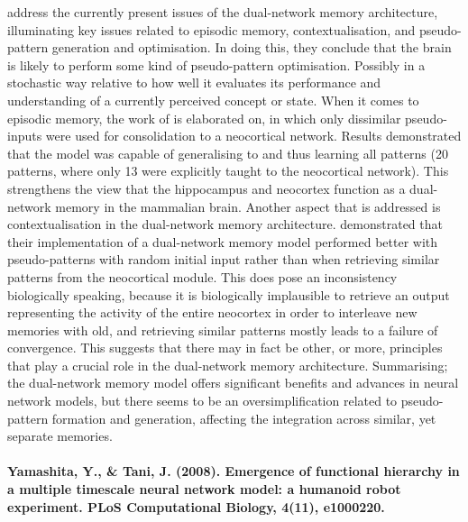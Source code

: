 \cite{French2001} address the currently present issues of the dual-network memory architecture, illuminating key issues related to episodic memory, contextualisation, and pseudo-pattern generation and optimisation. In doing this, they conclude that the brain is likely to perform some kind of pseudo-pattern optimisation. Possibly in a stochastic way relative to how well it evaluates its performance and understanding of a currently perceived concept or state. When it comes to episodic memory, the work of \cite{Ans2000} is elaborated on, in which only dissimilar pseudo-inputs were used for consolidation to a neocortical network. Results demonstrated that the model was capable of generalising to and thus learning all patterns (20 patterns, where only 13 were explicitly taught to the neocortical network). This strengthens the view that the hippocampus and neocortex function as a dual-network memory in the mammalian brain. Another aspect that is addressed is contextualisation in the dual-network memory architecture. \cite{Ans2000} demonstrated that their implementation of a dual-network memory model performed better with pseudo-patterns with random initial input rather than when retrieving similar patterns from the neocortical module. This does pose an inconsistency biologically speaking, because it is biologically implausible to retrieve an output representing the activity of the entire neocortex in order to interleave new memories with old, and retrieving similar patterns mostly leads to a failure of convergence. This suggests that there may in fact be other, or more, principles that play a crucial role in the dual-network memory architecture. Summarising; the dual-network memory model offers significant benefits and advances in neural network models, but there seems to be an oversimplification related to pseudo-pattern formation and generation, affecting the integration across similar, yet separate memories.
\\
\\
\textbf{Yamashita, Y., \& Tani, J. (2008). Emergence of functional hierarchy in a multiple timescale neural network model: a humanoid robot experiment. PLoS Computational Biology, 4(11), e1000220.}

